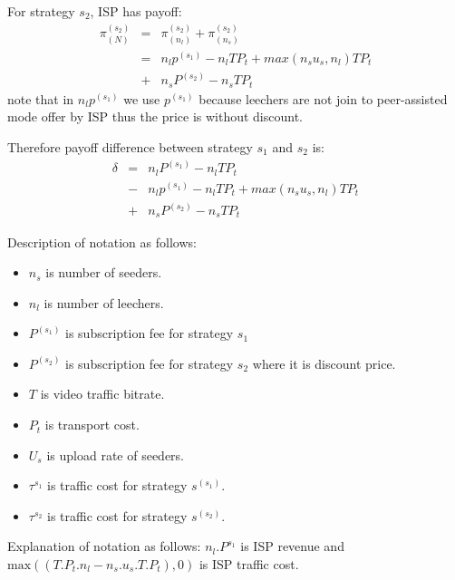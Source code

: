 \documentclass[paper]{ieice}
\begin{document}
For strategy $s_2$, ISP has payoff:
\begin{eqnarray}
	\pi^{(s_2)}_{(N)} &=& \pi^{(s_2)}_{(n_l)} + \pi^{(s_2)}_{(n_s)}\\
	\nonumber &=&n_l p^{(s_1)} - n_lTP_t + max (n_s u_s,n_l)T P_t\\
	&+&n_s P^{(s_2)} - n_s T P_t
\end{eqnarray}
note that in $n_l p^{(s_1)}$ we use $p^{(s_1)}$ because leechers are not join to peer-assisted mode offer by ISP thus the price is without discount.

Therefore payoff difference between strategy $s_1$ and $s_2$ is:
\begin{eqnarray}
	\delta &=& n_l P^{(s_1)} - n_l T P_t \\
	&-& n_l p^{(s_1)} - n_lTP_t + max (n_s u_s,n_l)T P_t \\
	&+& n_s P^{(s_2)} - n_s T P_t
\end{eqnarray}

Description of notation as follows:
\begin{itemize}
	\item $n_s$ is number of seeders.
	\item $n_l$ is number of leechers.
	\item $P^{(s_1)}$ is subscription fee for strategy $s_1$
	\item $P^{(s_2)}$ is subscription fee for strategy $s_2$ where it is discount price.
	\item $T$ is video traffic bitrate. 
	\item $P_t$ is transport cost. 
	\item $U_s$ is upload rate of seeders.
	\item $\tau^{s_1}$ is traffic cost for strategy $s^{(s_1)}$.
	\item $\tau^{s_2}$ is traffic cost for strategy $s^{(s_2)}$.
\end{itemize}
Explanation of notation as follows:
$n_l . P^{s_1}$ is ISP revenue and $\text{max}((T.P_t.n_l - n_s . u_s .T .P_t),0)$ is ISP traffic cost.
\end{document}
